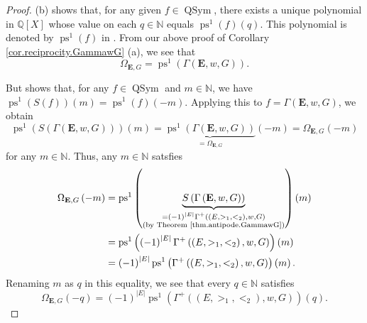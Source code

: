 \documentclass[12pt]{article}
\theoremstyle{plain}
\theoremstyle{definition}
\theoremstyle{remark}
\newcommand{\QSym}{{\operatorname{QSym}}}
\newcommand{\EE}{{\mathbf{E}}}
\newcommand{\NN}{{\mathbb{N}}}
\newcommand{\QQ}{{\mathbb{Q}}}
\begin{document}
\begin{proof}
(b) \cite[Proposition 7.7 (i)]{Reiner} shows that, for any given
$f\in \QSym $, there exists a unique polynomial in $\QQ
\left[  X\right]  $ whose value on each $q\in \NN $ equals
$\operatorname{ps}^{1}\left(  f\right)  \left(  q\right)  $. This
polynomial is denoted by $\operatorname{ps}^{1}\left(  f\right)  $
in \cite[Proposition 7.7]{Reiner}. From our above proof of Corollary
\ref{cor.reciprocity.GammawG} (a), we see that
\[
\Omega_{\mathbf{E},G}=\operatorname{ps}^{1}\left(  \Gamma\left(
 \EE ,w,G\right)  \right)  .
\]


But \cite[Proposition 7.7 (iii)]{Reiner} shows that, for any
$f \in \QSym$ and $m \in \NN$, we have
$\operatorname{ps}^{1}\left(  S\left(  f\right)  \right)
\left(  m\right)
=\operatorname{ps}^{1}\left(  f\right)  \left(  -m\right)  $.
Applying this to $f=\Gamma\left(   \EE ,w,G\right)  $, we obtain
\[
\operatorname{ps}^{1}\left(  S\left(  \Gamma\left(  {\mathbf{E}%
},w,G\right)  \right)  \right)  \left(  m\right)
=\underbrace{\operatorname{ps}^{1}\left(  \Gamma\left(  {\mathbf{E}%
},w,G\right)  \right)  }_{=\Omega_{\mathbf{E},G}}\left(  -m\right)
=\Omega_{\mathbf{E},G}\left(  -m\right)
\]
for any $m\in \NN $. Thus, any $m\in \NN $ satsfies%
\begin{align*}
\Omega_{\mathbf{E},G}\left(  -m\right)   &  =\operatorname{ps}^{1}%
\left(  \underbrace{S\left(  \Gamma\left(  \EE ,w,G\right)  \right)
}_{\substack{=\left(  -1\right)  ^{\left\vert E\right\vert }\Gamma^{+}\left(
\left(  E,>_{1},<_{2}\right)  ,w,G\right)  \\\text{(by Theorem
\ref{thm.antipode.GammawG})}}}\right)  \left(  m\right) \\
&  =\operatorname{ps}^{1}\left(  \left(  -1\right)  ^{\left\vert
E\right\vert }\Gamma^{+}\left(  \left(  E,>_{1},<_{2}\right)  ,w,G\right)
\right)  \left(  m\right) \\
&  =\left(  -1\right)  ^{\left\vert E\right\vert }
\operatorname{ps}^{1}
\left(  \Gamma^{+}\left(  \left(  E,>_{1},<_{2}\right)
,w,G\right)  \right)  \left(  m\right)  .
\end{align*}
Renaming $m$ as $q$ in this equality, we see that every $q\in \NN $
satisfies
\begin{equation}
\Omega_{\mathbf{E},G}\left(  -q\right)  =\left(  -1\right)  ^{\left\vert
E\right\vert }\operatorname{ps}^{1}\left(  \Gamma^{+}\left(  \left(
E,>_{1},<_{2}\right)  ,w,G\right)  \right)  \left(  q\right)  .
\label{pf.cor.reciprocity.GammawG.b.2}
\end{equation}



\end{proof}
\end{document}
